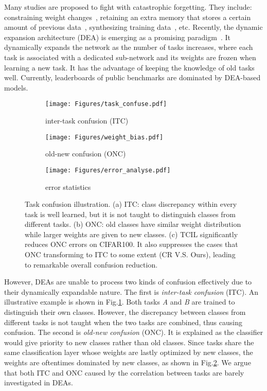 \documentclass[letterpaper]{article} \usepackage{aaai23}  \usepackage{times}  \usepackage{helvet}  \usepackage{courier}  \usepackage[hyphens]{url}  \usepackage{graphicx} \urlstyle{rm} \def\UrlFont{\rm}  \usepackage{natbib}  \usepackage{caption} \frenchspacing  \setlength{\pdfpagewidth}{8.5in}  \setlength{\pdfpageheight}{11in}  \usepackage{algorithm}
\begin{document}
Many studies are proposed to fight with catastrophic forgetting. They include: constraining weight changes~\cite{t38, e1, p24, e2, w20}, retaining an extra memory that stores a certain amount of previous data~\cite{s43, s14, w5, v29, e2}, synthesizing training data~\cite{e4,e5,zhu2021prototype,zhu2022self}, etc. Recently, the dynamic expansion architecture (DEA) is emerging as a promising paradigm~\cite{t23, t27, t33, t70, t47, t0}. It dynamically expands the network as the number of tasks increases, where each task is associated with a dedicated sub-network and its weights are frozen when learning a new task. It has the advantage of keeping the knowledge of old tasks well. Currently, leaderboards of public benchmarks are dominated by DEA-based models. 

\begin{figure}
\centering
    \begin{subfigure}[t]{0.48\textwidth}
          \centering
            \texttt{[image: Figures/task\_confuse.pdf]}
            \caption{inter-task confusion (ITC)}
            \label{img1_a}
    \end{subfigure}
    \begin{subfigure}[t]{0.25\textwidth}
            \centering
            \texttt{[image: Figures/weight\_bias.pdf]}
            \caption{old-new confusion (ONC)}
            \label{img1_b}
    \end{subfigure}
    \begin{subfigure}[t]{0.20\textwidth}
            \centering
            \texttt{[image: Figures/error\_analyse.pdf]}
            \caption{error statistics}
            \label{img1_c}
    \end{subfigure}
\caption{Task confusion illustration. (a) ITC: class discrepancy within every task is well learned, but it is not taught to distinguish classes from different tasks. (b) ONC: old classes have similar weight distribution while larger weights are given to new classes. (c) TCIL significantly reduces ONC errors on CIFAR100. It also suppresses the cases that ONC transforming to ITC to some extent (CR V.S. Ours), leading to remarkable overall confusion reduction. }
\end{figure}

However, DEAs are unable to process two kinds of confusion effectively due to their dynamically expandable nature. The first is \emph{inter-task confusion} (ITC). An illustrative example is shown in Fig.\ref{img1_a}. Both tasks \emph{A} and \emph{B} are trained to distinguish their own classes. However, the discrepancy between classes from different tasks is not taught when the two tasks are combined, thus causing confusion. The second is \emph{old-new confusion} (ONC). It is explained as the classifier would give priority to new classes rather than old classes. Since tasks share the same classification layer whose weights are lastly optimized by new classes, the weights are oftentimes dominated by new classes, as shown in Fig.\ref{img1_b}. We argue that both ITC and ONC caused by the correlation between tasks are barely investigated in DEAs. 
\end{document}
